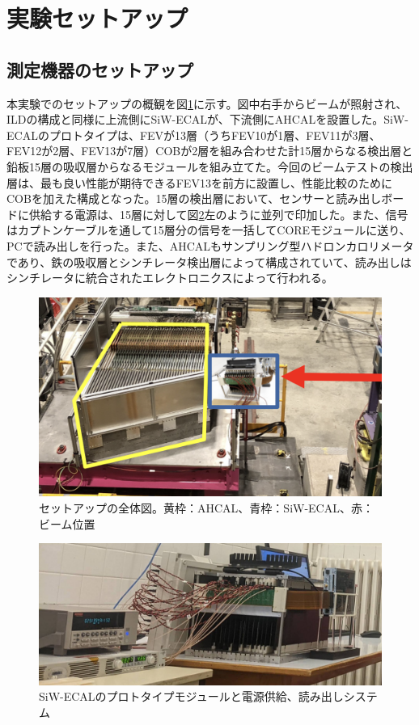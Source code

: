\section{実験セットアップ}
\subsection{測定機器のセットアップ}
本実験でのセットアップの概観を図\ref{setup1}に示す。図中右手からビームが照射され、ILDの構成と同様に上流側にSiW-ECALが、下流側にAHCALを設置した。SiW-ECALのプロトタイプは、FEVが13層（うちFEV10が1層、FEV11が3層、FEV12が2層、FEV13が7層）COBが2層を組み合わせた計15層からなる検出層と鉛板15層の吸収層からなるモジュールを組み立てた。今回のビームテストの検出層は、最も良い性能が期待できるFEV13を前方に設置し、性能比較のためにCOBを加えた構成となった。15層の検出層において、センサーと読み出しボードに供給する電源は、15層に対して図\ref{setup2}左のように並列で印加した。また、信号はカプトンケーブルを通して15層分の信号を一括してCOREモジュールに送り、PCで読み出しを行った。また、AHCALもサンプリング型ハドロンカロリメータであり、鉄の吸収層とシンチレータ検出層によって構成されていて、読み出しはシンチレータに統合されたエレクトロニクスによって行われる。
\begin{figure}[H]
\begin{center}
 \includegraphics[keepaspectratio, scale=0.3]
 	{Figure/Beamtest/setup1.png}
 		\caption{セットアップの全体図。黄枠：AHCAL、青枠：SiW-ECAL、赤：ビーム位置}
		\label{setup1}
		\end{center}
\end{figure}

\begin{figure}[H]
\begin{center}
 \includegraphics[keepaspectratio, scale=0.2]
 	{Figure/Beamtest/setup2.png}
 		\caption{SiW-ECALのプロトタイプモジュールと電源供給、読み出しシステム}
		\label{setup2}
\end{center}
\end{figure}

